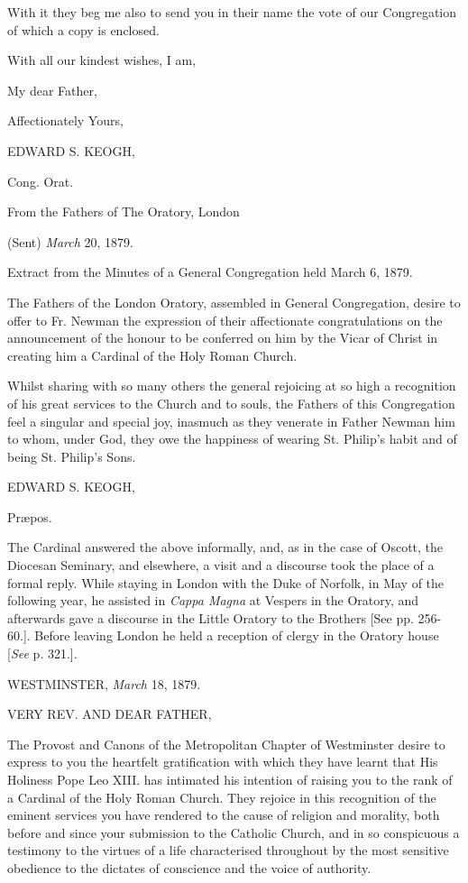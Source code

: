 With it they beg me also to send you in their name the vote of our
Congregation of which a copy is enclosed.

With all our kindest wishes, I am,

My dear Father,

Affectionately Yours,

EDWARD S. KEOGH,

Cong. Orat.

From the Fathers of The Oratory, London

(Sent) \emph{March} 20, 1879.

Extract from the Minutes of a General Congregation
held March 6, 1879.

The Fathers of the London Oratory, assembled in General
Congregation, desire to offer to Fr. Newman the expression of their
affectionate congratulations on the announcement of the honour to be
conferred on him by the Vicar of Christ in creating him a Cardinal of
the Holy Roman Church.

Whilst sharing with so many others the general rejoicing at so high
a recognition of his great services to the Church and to souls,
the Fathers of this Congregation feel a singular and special joy,
inasmuch as they venerate in Father Newman him to whom, under God,
they owe the happiness of wearing St. Philip's habit and of being St.
Philip's Sons.

EDWARD S. KEOGH,

Præpos.

The Cardinal answered the above informally, and, as in the case of
Oscott, the Diocesan Seminary, and elsewhere, a visit and a discourse
took the place of a formal reply. While staying in London with the
Duke of Norfolk, in May of the following year, he assisted in \emph{Cappa
Magna} at Vespers in the Oratory, and afterwards gave a discourse
in the Little Oratory to the Brothers [See pp. 256-60.]. Before
leaving London he held a reception of clergy in the Oratory house [\emph{See}
p. 321.].


WESTMINSTER, \emph{March} 18, 1879.

VERY REV. AND
DEAR FATHER,

The Provost and Canons of the Metropolitan Chapter of Westminster
desire to express to you the heartfelt gratification with which they
have learnt that His Holiness Pope Leo XIII. has intimated his
intention of raising you to the rank of a Cardinal of the Holy Roman
Church. They rejoice in this recognition of the eminent services you
have rendered to the cause of religion and morality, both before and
since your submission to the Catholic Church, and in so conspicuous a
testimony to the virtues of a life characterised throughout by
the most sensitive obedience to the dictates of conscience and the
voice of authority.

